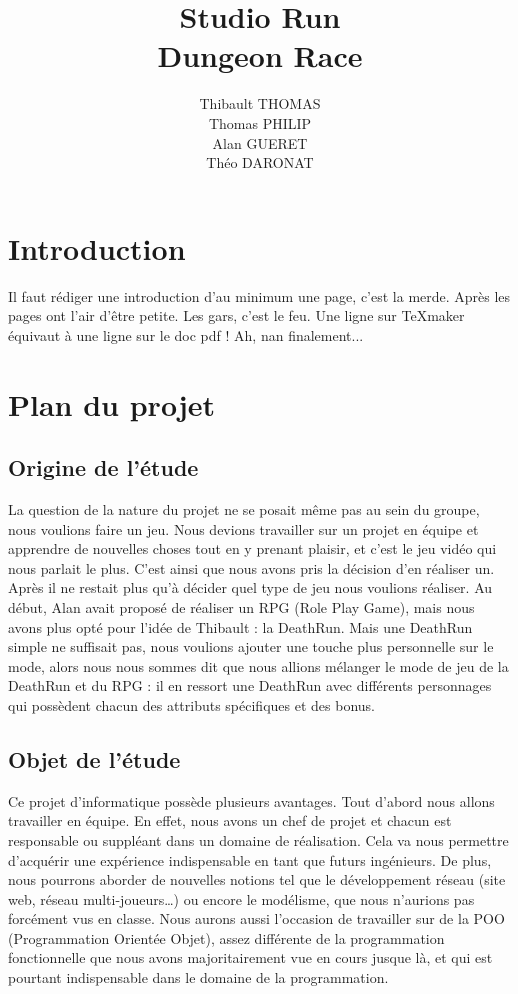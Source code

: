 \documentclass[12pt]{report}
\title{\LARGE Studio Run \\ \large Dungeon Race}
\date{}
\author{\small Thibault THOMAS \\ \small Thomas PHILIP \\ \small Alan GUERET \\ \small Théo DARONAT}
\begin{document}
\maketitle
\tableofcontents
\pagebreak
\section{Introduction}
Il faut rédiger une introduction d'au minimum une page, c'est la merde. Après les pages ont l'air d'être petite. Les gars, c'est le feu. Une ligne sur TeXmaker équivaut à une ligne sur le doc pdf ! Ah, nan finalement...
\section{Plan du projet}

	\subsection{Origine de l'étude}
	La question de la nature du projet ne se posait même pas au sein du groupe, nous voulions faire un jeu. Nous devions travailler sur un projet en équipe et apprendre de nouvelles choses tout en y prenant plaisir, et c’est le jeu vidéo qui nous parlait le plus. C’est ainsi que nous avons pris la décision d’en réaliser un. Après il ne restait plus qu’à décider quel type de jeu nous voulions réaliser. Au début, Alan avait proposé de réaliser un RPG (Role Play Game), mais nous avons plus opté pour l’idée de Thibault : la DeathRun. Mais une DeathRun simple ne suffisait pas, nous voulions ajouter une touche plus personnelle sur le mode, alors nous nous sommes dit que nous allions mélanger le mode de jeu de la DeathRun et du RPG : il en ressort une DeathRun avec différents personnages qui possèdent chacun des attributs spécifiques et des bonus.
	
	\subsection{Objet de l'étude}
		Ce projet d’informatique possède plusieurs avantages. Tout d’abord nous allons travailler en équipe. En effet, nous avons un chef de projet et chacun est responsable ou suppléant dans un domaine de réalisation. Cela va nous permettre d'acquérir une expérience indispensable en tant que futurs ingénieurs. De plus, nous pourrons aborder de nouvelles notions tel que le développement réseau (site web, réseau multi-joueurs…) ou encore le modélisme, que nous n’aurions pas forcément vus en classe. Nous aurons aussi l’occasion de travailler sur de la POO (Programmation Orientée Objet), assez différente de la programmation fonctionnelle que nous avons majoritairement vue en cours jusque là, et qui est pourtant indispensable dans le domaine de la programmation. 
\end{document}
